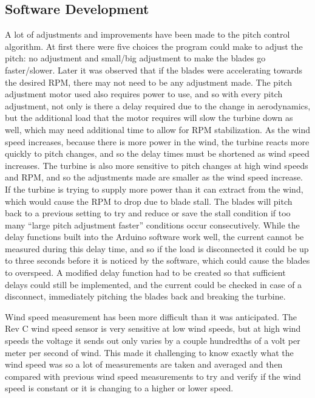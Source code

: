 \documentclass[../ewet_cwc_report.tex]{subfiles}
\begin{document}
\subsection{Software Development}
A lot of adjustments and improvements have been made to the
pitch control algorithm. At first there were five choices the
program could make to adjust the pitch: no adjustment and
small/big adjustment to make the blades go faster/slower.
Later it was observed that if the blades were accelerating
towards the desired RPM, there may not need to be any
adjustment made. The pitch adjustment motor used also requires
power to use, and so with every pitch adjustment, not only is
there a delay required due to the change in aerodynamics, but
the additional load that the motor requires will slow the
turbine down as well, which may need additional time to allow
for RPM stabilization. As the wind speed increases, because
there is more power in the wind, the turbine reacts more
quickly to pitch changes, and so the delay times must be
shortened as wind speed increases. The turbine is also more
sensitive to pitch changes at high wind speeds and RPM, and so
the adjustments made are smaller as the wind speed increase.
If the turbine is trying to supply more power than it can
extract from the wind, which would cause the RPM to drop due to
blade stall. The blades will pitch back to a previous setting
to try and reduce or save the stall condition if too many
``large pitch adjustment faster'' conditions occur
consecutively. While the delay functions built into the
Arduino software work well, the current cannot be measured
during this delay time, and so if the load is disconnected it
could be up to three seconds before it is noticed by the
software, which could cause the blades to overspeed. A
modified delay function had to be created so that sufficient
delays could still be implemented, and the current could be
checked in case of a disconnect, immediately pitching the
blades back and breaking the turbine.

Wind speed measurement has been more difficult than it was
anticipated. The Rev C wind speed sensor is very sensitive at
low wind speeds, but at high wind speeds the voltage it sends
out only varies by a couple hundredths of a volt per meter per
second of wind. This made it challenging to know exactly what
the wind speed was so a lot of measurements are taken and
averaged and then compared with previous wind speed
measurements to try and verify if the wind speed is constant
or it is changing to a higher or lower speed.
\end{document}
